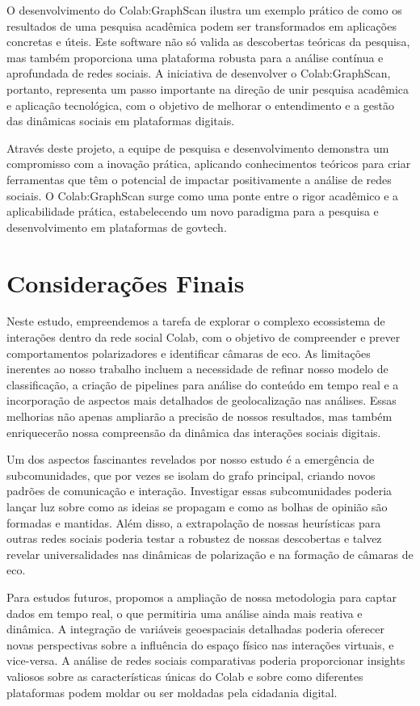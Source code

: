 O desenvolvimento do Colab:GraphScan ilustra um exemplo prático de como os resultados de uma pesquisa acadêmica podem ser transformados em aplicações concretas e úteis. Este software não só valida as descobertas teóricas da pesquisa, mas também proporciona uma plataforma robusta para a análise contínua e aprofundada de redes sociais. A iniciativa de desenvolver o Colab:GraphScan, portanto, representa um passo importante na direção de unir pesquisa acadêmica e aplicação tecnológica, com o objetivo de melhorar o entendimento e a gestão das dinâmicas sociais em plataformas digitais.

Através deste projeto, a equipe de pesquisa e desenvolvimento demonstra um compromisso com a inovação prática, aplicando conhecimentos teóricos para criar ferramentas que têm o potencial de impactar positivamente a análise de redes sociais. O Colab:GraphScan surge como uma ponte entre o rigor acadêmico e a aplicabilidade prática, estabelecendo um novo paradigma para a pesquisa e desenvolvimento em plataformas de govtech.

\section{Considerações Finais}

Neste estudo, empreendemos a tarefa de explorar o complexo ecossistema de interações dentro da rede social Colab, com o objetivo de compreender e prever comportamentos polarizadores e identificar câmaras de eco. As limitações inerentes ao nosso trabalho incluem a necessidade de refinar nosso modelo de classificação, a criação de pipelines para análise do conteúdo em tempo real e a incorporação de aspectos mais detalhados de geolocalização nas análises. Essas melhorias não apenas ampliarão a precisão de nossos resultados, mas também enriquecerão nossa compreensão da dinâmica das interações sociais digitais.

Um dos aspectos fascinantes revelados por nosso estudo é a emergência de subcomunidades, que por vezes se isolam do grafo principal, criando novos padrões de comunicação e interação. Investigar essas subcomunidades poderia lançar luz sobre como as ideias se propagam e como as bolhas de opinião são formadas e mantidas. Além disso, a extrapolação de nossas heurísticas para outras redes sociais poderia testar a robustez de nossas descobertas e talvez revelar universalidades nas dinâmicas de polarização e na formação de câmaras de eco.

Para estudos futuros, propomos a ampliação de nossa metodologia para captar dados em tempo real, o que permitiria uma análise ainda mais reativa e dinâmica. A integração de variáveis geoespaciais detalhadas poderia oferecer novas perspectivas sobre a influência do espaço físico nas interações virtuais, e vice-versa. A análise de redes sociais comparativas poderia proporcionar insights valiosos sobre as características únicas do Colab e sobre como diferentes plataformas podem moldar ou ser moldadas pela cidadania digital.

